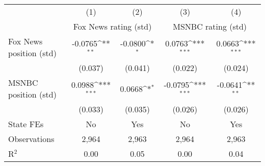 {
\def\sym#1{\ifmmode^{#1}\else\(^{#1}\)\fi}
\begin{tabular}{l*{4}{c}}
\toprule
                    &\multicolumn{1}{c}{(1)}&\multicolumn{1}{c}{(2)}&\multicolumn{1}{c}{(3)}&\multicolumn{1}{c}{(4)}\\
                    &\multicolumn{2}{c}{Fox News rating (std)}&\multicolumn{2}{c}{MSNBC rating (std)}\\
\midrule
Fox News position (std)&     -0.0765\sym{**} &     -0.0800\sym{*}  &      0.0763\sym{***}&      0.0663\sym{***}\\
                    &     (0.037)         &     (0.041)         &     (0.022)         &     (0.024)         \\
\addlinespace
MSNBC position (std)&      0.0988\sym{***}&      0.0668\sym{*}  &     -0.0795\sym{***}&     -0.0641\sym{**} \\
                    &     (0.033)         &     (0.035)         &     (0.026)         &     (0.026)         \\
\addlinespace
State FEs           &          No         &         Yes         &          No         &         Yes         \\
\midrule
Observations        &       2,964         &       2,963         &       2,964         &       2,963         \\
R$^2$               &        0.00         &        0.05         &        0.00         &        0.04         \\
\bottomrule
\end{tabular}
}

